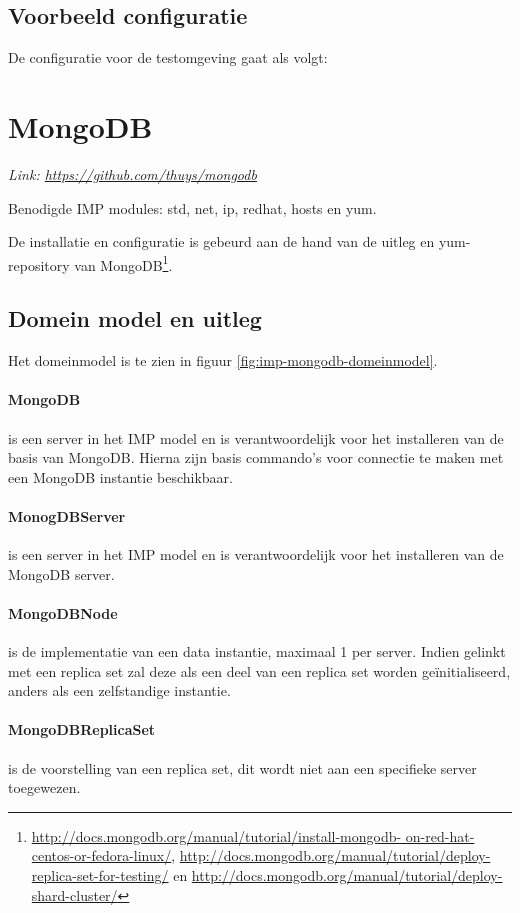 \subsection{Voorbeeld configuratie}
De configuratie voor de testomgeving gaat als volgt: 




\section{MongoDB}
\textit{Link: \url{https://github.com/thuys/mongodb}}

Benodigde IMP modules: std, net, ip, redhat, hosts en yum. 

De installatie en configuratie is gebeurd aan de hand van de uitleg en yum-repository van MongoDB\footnote{\url {http://docs.mongodb.org/manual/tutorial/install-mongodb- on-red-hat-centos-or-fedora-linux/}, \url{http://docs.mongodb.org/manual/tutorial/deploy-replica-set-for-testing/} en  \url{http://docs.mongodb.org/manual/tutorial/deploy-shard-cluster/}}. 

\subsection{Domein model en uitleg}
Het domeinmodel is te zien in figuur \ref{fig:imp-mongodb-domeinmodel}.

	\paragraph{MongoDB} is een server in het IMP model en is verantwoordelijk voor het installeren van de basis van MongoDB. Hierna zijn basis commando's voor connectie te maken met een MongoDB instantie beschikbaar. 
	\paragraph{MonogDBServer} is een server in het IMP model en is verantwoordelijk voor het installeren van de MongoDB server. 
	\paragraph{MongoDBNode} is de implementatie van een data instantie, maximaal 1 per server. Indien gelinkt met een replica set zal deze als een deel van een replica set worden geïnitialiseerd, anders als een zelfstandige instantie. 
	\paragraph{MongoDBReplicaSet} is de voorstelling van een replica set, dit wordt niet aan een specifieke server toegewezen. 
